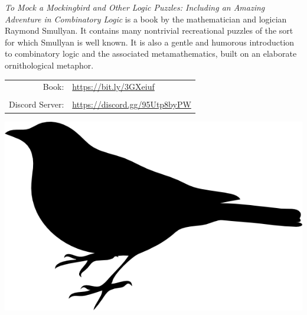 \documentclass[letterpaper]{article}
\begin{document}


\emph{To Mock a Mockingbird and Other Logic Puzzles: Including an Amazing Adventure in Combinatory Logic} is a book by the mathematician and logician Raymond Smullyan. It contains many nontrivial recreational puzzles of the sort for which Smullyan is well known. It is also a gentle and humorous introduction to combinatory logic and the associated metamathematics, built on an elaborate ornithological metaphor. 

\vspace{0.75in}
\begin{tabular}{rl}
    \csctimefont Book: & \url{https://bit.ly/3GXeiuf}  \\
    & \\
    \csctimefont Discord Server: & \url{https://discord.gg/95Utp8byPW}
\end{tabular}

\vspace{0.5in}
\begin{center}
\includegraphics[scale = 0.75]{mockingbird_logo.png}
\end{center}

\vspace{-15pt}
\vspace{-15pt}
\centering {}
\end{document}
